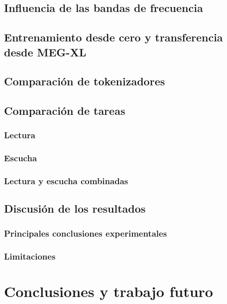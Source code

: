 \documentclass[11pt,spanish,listoffigures,listoftables]{tfgetsinf}
\begin{document}
\section{Influencia de las bandas de frecuencia}

\section{Entrenamiento desde cero y transferencia desde MEG-XL}


\section{Comparación de tokenizadores}

\section{Comparación de tareas}
\subsection{Lectura}
\subsection{Escucha}
\subsection{Lectura y escucha combinadas}

\section{Discusión de los resultados}
\subsection{Principales conclusiones experimentales}
\subsection{Limitaciones}


\chapter{Conclusiones y trabajo futuro}
\end{document}
